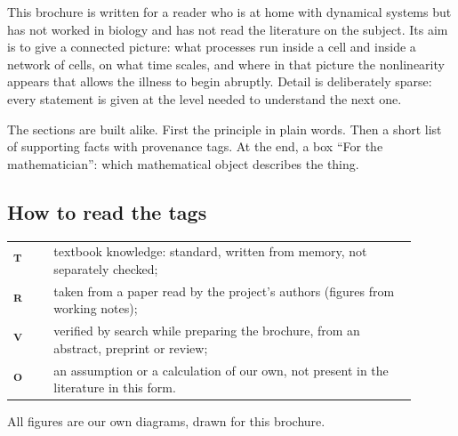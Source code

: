 \documentclass[11pt,a4paper,landscape,twocolumn]{article}
\newcommand{\tU}{\textsuperscript{\sffamily\bfseries\color{cM}T}}
\newcommand{\tS}{\textsuperscript{\sffamily\bfseries\color{cB}R}}
\newcommand{\tP}{\textsuperscript{\sffamily\bfseries\color{cA}V}}
\newcommand{\tD}{\textsuperscript{\sffamily\bfseries\color{cO}O}}
\begin{document}

This brochure is written for a reader who is at home with dynamical systems but has not worked in biology and has not read the literature on the subject. Its aim is to give a connected picture: what processes run inside a cell and inside a network of cells, on what time scales, and where in that picture the nonlinearity appears that allows the illness to begin abruptly. Detail is deliberately sparse: every statement is given at the level needed to understand the next one.

The sections are built alike. First the principle in plain words. Then a short list of supporting facts with provenance tags. At the end, a box ``For the mathematician'': which mathematical object describes the thing.

\subsection{How to read the tags}
\begin{tabular}{@{}l@{\ \ }p{0.9\linewidth}@{}}
\tU & textbook knowledge: standard, written from memory, not separately checked;\\
\tS & taken from a paper read by the project's authors (figures from working notes);\\
\tP & verified by search while preparing the brochure, from an abstract, preprint or review;\\
\tD & an assumption or a calculation of our own, not present in the literature in this form.\\
\end{tabular}

All figures are our own diagrams, drawn for this brochure.
\end{document}
